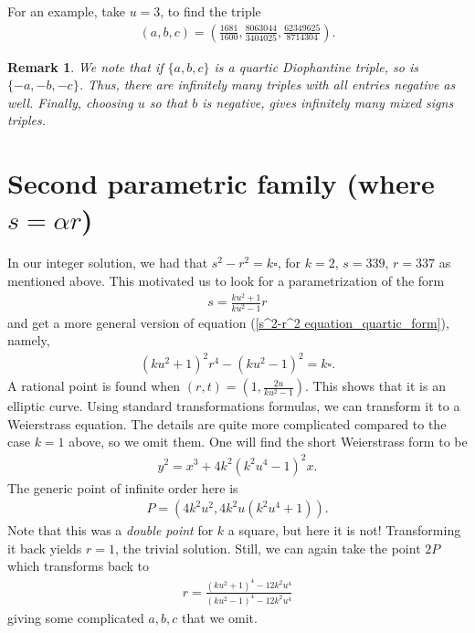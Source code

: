 \documentclass{amsart}
\newtheorem{remark}{Remark}
\begin{document}
For an example, take $u=3$, to find the triple
\begin{align*}
   (a,b,c) = \left(\frac{1681}{1600},\frac{8063044}{3404025}, \frac{62349625}{8714304} \right) .
\end{align*}
\begin{remark}
    We note that if $\{a,b,c\}$ is a quartic Diophantine triple, so is $\{-a,-b,-c\}$. Thus, there are infinitely many triples with all entries negative as well. Finally, choosing $u$ so that $b$ is negative, gives infinitely many mixed signs triples.
\end{remark}


\section{Second parametric family (where $s=\alpha r$)}
In our integer solution, we had that $s^2-r^2=k\square$, for $k=2$, $s=339$, $r=337$ as mentioned above. This motivated us to look for a parametrization of the form
\begin{align*}
    s = \frac{ku^2+1}{ku^2-1}r
\end{align*}
and get a more general version of equation (\ref{s^2-r^2 equation_quartic_form}), namely,
\begin{align} \label{s^2-r^2 = k*kvadrat}
    (ku^2+1)^2r^4-(ku^2-1)^2 = k \square.
\end{align}
A rational point is found when $(r,t)=\left(1,\frac{2u}{ku^2-1}\right)$. This shows that it is an elliptic curve. Using standard transformations formulas, we can transform it to a Weierstrass equation. The details are quite more complicated compared to the case $k=1$ above, so we omit them. One will find the short Weierstrass form to be
\begin{align} \label{s^2-r^2 = k*kvadrat Weierstrass}
    y^2 = x^3+4k^2(k^2u^4-1)^2x.
\end{align}
The generic point of infinite order here is 
\begin{align*}
 P = (4k^2u^2, 4k^2u(k^2u^4+1)).
\end{align*}
Note that this was a \emph{double point} for $k$ a square, but here it is not! Transforming it back yields $r=1$, the trivial solution.
Still, we can again take the point $2P$ which transforms back to
\begin{align*}
r = \frac{(ku^2+1)^4-12k^2u^4}{(ku^2-1)^4-12k^2u^4}
\end{align*}
giving some complicated $a,b,c$ that we omit. 
\end{document}
